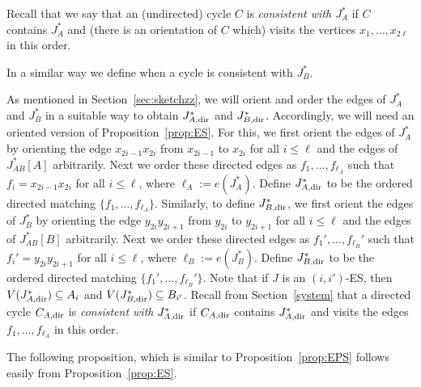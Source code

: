 \documentclass{memo-l}
\def\COMMENT#1{}
\numberwithin{section}{chapter}
\numberwithin{equation}{section}
\numberwithin{firstthm}{section}
\numberwithin{figure}{section}
\begin{document}
{Recall that we say that an (undirected) cycle $C$ is \emph{consistent with $J_A^*$} if $C$ contains $J_A^*$ and (there is an orientation of $C$ which)
visits the vertices $x_1, \dots ,x_{2\ell}$ in this order.%
    \COMMENT{We need to prescribe a vertex rather than an edge ordering as it is important in Proposition~\ref{prop:ES}.}
In a similar way we define when a cycle is consistent with $J_B^*$.



As mentioned in Section~\ref{sec:sketchzz}, we will orient and order the edges of $J^*_A$ and $J^*_{B}$ in a suitable way
to obtain $J^*_{A, {\rm dir}}$ and $J^*_{B, {\rm dir}}$.
Accordingly, we will need an oriented version of Proposition~\ref{prop:ES}.
For this,  we first orient the edges of $J^*_{A}$ by orienting the edge $x_{2i-1} x_{2i}$ from $x_{2i-1}$ to $x_{2i}$ for all $i \le \ell$ and the edges of $J^*_{AB}[A]$ arbitrarily. 
Next we order these directed edges as $f_1, \dots, f_{\ell_A}$ such that $f_i = x_{2i-1} x_{2i}$ for all $i \le \ell$, where $\ell_A := e(J_A^*)$.
Define $J_{A, { \rm dir } }^*$ to be the ordered directed matching $\{f_1, \dots, f_{\ell_A} \}$.
Similarly, to define $J_{B, { \rm dir } }^*$, we first orient the edges of $J^*_{B}$ by orienting the edge $y_{2i} y_{2i+1}$
from $y_{2i}$ to $y_{2i+1}$ for all $i \le \ell$ and the edges of $J^*_{AB}[B]$ arbitrarily. 
Next we order these directed edges as $f_1', \dots, f_{\ell_B}'$ such that $f_i' = y_{2i} y_{2i+1}$ for all $i \le \ell$, where $\ell_B := e(J_B^*)$.
Define $J_{B, { \rm dir } }^*$ to be the ordered directed matching $\{f_1', \dots, f_{\ell_B}' \}$.
Note that if $J$ is an $(i,i')$-ES, then $V(J_{A, { \rm dir } }^*) \subseteq A_i$ and $V(J_{B, { \rm dir } }^*) \subseteq B_{i'}$.
Recall from Section~\ref{system} that a directed cycle $C_{A, {\rm dir}}$ is \emph{consistent with} $J_{A, { \rm dir } }^*$
if $C_{A, {\rm dir}}$ contains $J_{A, { \rm dir } }^*$ and visits the edges $f_1, \dots ,f_{\ell_A}$ in this order.%
   \COMMENT{Daniela: reworded} 
The following proposition, which is similar to Proposition~\ref{prop:EPS} follows easily from Proposition~\ref{prop:ES}.

}
\end{document}
